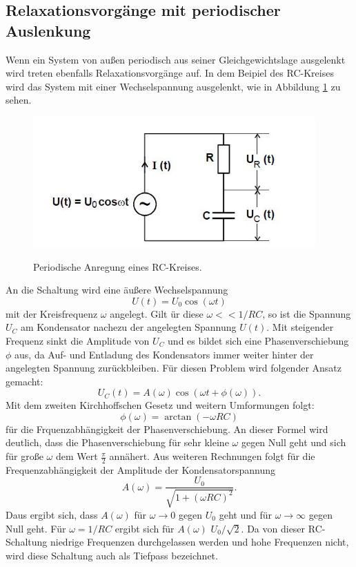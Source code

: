 \subsection{Relaxationsvorgänge mit periodischer Auslenkung}
Wenn ein System von außen periodisch aus seiner Gleichgewichtslage ausgelenkt wird
treten ebenfalls Relaxationsvorgänge auf. In dem Beipiel des RC-Kreises wird
das System mit einer Wechselspannung ausgelenkt, wie in Abbildung \ref{fig:RCsin}
zu sehen.
\begin{figure}[H]
  \centering
  \includegraphics[height=5cm]{RCsin.JPG}
  \caption{Periodische Anregung eines RC-Kreises.}
  \cite{skript}
  \label{fig:RCsin}
\end{figure}
An die Schaltung wird eine äußere Wechselspannung
\begin{equation}
  U(t)=U_{0}\cos(\omega t)
\end{equation}
mit der Kreisfrequenz $\omega$ angelegt. Gilt ür diese $\omega<<1/RC$, so ist
die Spannung $U_{C}$ am Kondensator nachezu der angelegten Spannung $U(t)$.
Mit steigender Frequenz sinkt die Amplitude von $U_{C}$ und es bildet sich eine
Phasenverschiebung $\phi$ aus, da Auf- und Entladung des Kondensators immer weiter
hinter der angelegten Spannung zurückbleiben.
Für diesen Problem wird folgender Ansatz gemacht:
\begin{equation}
  U_{C}(t)=A(\omega)\cos(\omega t + \phi(\omega)).
\end{equation}
Mit dem zweiten Kirchhoffschen Gesetz und weitern Umformungen folgt:
\begin{equation}
  \phi(\omega)= \arctan(-\omega RC)
  \label{eqn:phi}
\end{equation}
für die Frquenzabhängigkeit der Phasenverschiebung.
An dieser Formel wird deutlich, dass die Phasenverschiebung für sehr kleine
$\omega$ gegen Null geht und sich für große $\omega$ dem Wert $\frac{\pi}{2}$
annähert.
Aus weiteren Rechnungen folgt für die Frequenzabhängigkeit der Amplitude der
Kondensatorspannung
\begin{equation}
  A(\omega)=\frac{U_{0}}{\sqrt{1+(\omega RC)^2}}.
  \label{eqn:amplitude}
\end{equation}
Daus ergibt sich, dass $A(\omega)$ für $\omega \to 0$ gegen $U_{0}$ geht und
für $\omega \to \infty$ gegen Null geht. Für $\omega = 1/RC$ ergibt sich für $A(\omega)$
$U_{0}/\sqrt{2}$.
Da von dieser RC-Schaltung niedrige Frequenzen durchgelassen werden und
hohe Frequenzen nicht, wird diese Schaltung auch als Tiefpass bezeichnet.
